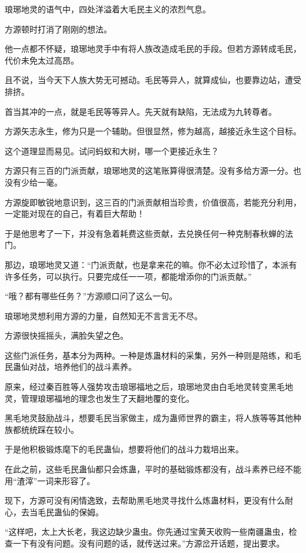 \begin{this_body}
琅琊地灵的语气中，四处洋溢着大毛民主义的浓烈气息。

方源顿时打消了刚刚的想法。

他一点都不怀疑，琅琊地灵手中有将人族改造成毛民的手段。但若方源转成毛民，代价未免太过高昂。

且不说，当今天下人族大势无可撼动。毛民等异人，就算成仙，也要靠边站，遭受排挤。

首当其冲的一点，就是毛民等等异人。先天就有缺陷，无法成为九转尊者。

方源矢志永生，修为只是一个辅助。但很显然，修为越高，越接近永生这个目标。

这个道理显而易见。试问蚂蚁和大树，哪一个更接近永生？

方源只有三百的门派贡献，琅琊地灵的这笔账算得很清楚。没有多给方源一分。也没有少给一毫。

方源旋即敏锐地意识到，这三百的门派贡献相当珍贵，价值很高，若能充分利用，一定能对现在的自己，有着巨大帮助！

于是他思考了一下，并没有急着耗费这些贡献，去兑换任何一种克制春秋蝉的法门。

那边，琅琊地灵又道：“门派贡献，也是拿来花的嘛。你不必太过珍惜了，本派有许多任务，可以执行。只要完成任一一项，都能增添你的门派贡献。”

“哦？都有哪些任务？”方源顺口问了这么一句。

琅琊地灵想利用方源的力量，自然知无不言言无不尽。

方源很快摇摇头，满脸失望之色。

这些门派任务，基本分为两种。一种是炼蛊材料的采集，另外一种则是陪练，和毛民蛊仙对战，培养他们的战斗素养。

原来，经过秦百胜等人强势攻击琅琊福地之后，琅琊地灵由白毛地灵转变黑毛地灵，管理琅琊福地的理念也发生了天翻地覆的变化。

黑毛地灵鼓励战斗，想要毛民当家做主，成为蛊师世界的霸主，将人族等等其他种族都统统踩在较小。

于是他积极锻炼麾下的毛民蛊仙，想要将他们的战斗力栽培出来。

在此之前，这些毛民蛊仙都只会炼蛊，平时的基础锻炼都没有，战斗素养已经不能用“渣滓”一词来形容了。

现下，方源可没有闲情逸致，去帮助黑毛地灵寻找什么炼蛊材料，更没有什么耐心，去当毛民蛊仙的保姆。

“这样吧，太上大长老，我这边缺少蛊虫。你先通过宝黄天收购一些南疆蛊虫，检查一下有没有问题。没有问题的话，就传送过来。”方源岔开话题，提出要求。


\end{this_body}
